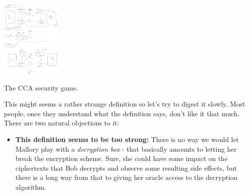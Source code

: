 \hypertarget{CCAdef}{}

\begin{marginfigure}
\centering
\includegraphics[width=\linewidth, height=1.5in, keepaspectratio]{../figure/cca-game.jpg}
\caption{The CCA security game.}
\label{CCAgamefig}
\end{marginfigure}

This might seems a rather strange definition so let's try to digest it
slowly. Most people, once they understand what the definition says,
don't like it that much. There are two natural objections to it:

\begin{itemize}
\tightlist
\item
  \textbf{This definition seems to be too strong:} There is no way we
  would let Mallory play with a \emph{decryption box} - that basically
  amounts to letting her break the encryption scheme. Sure, she could
  have some impact on the ciphertexts that Bob decrypts and observe some
  resulting side effects, but there is a long way from that to giving
  her oracle access to the decryption algorithm.
\end{itemize}

